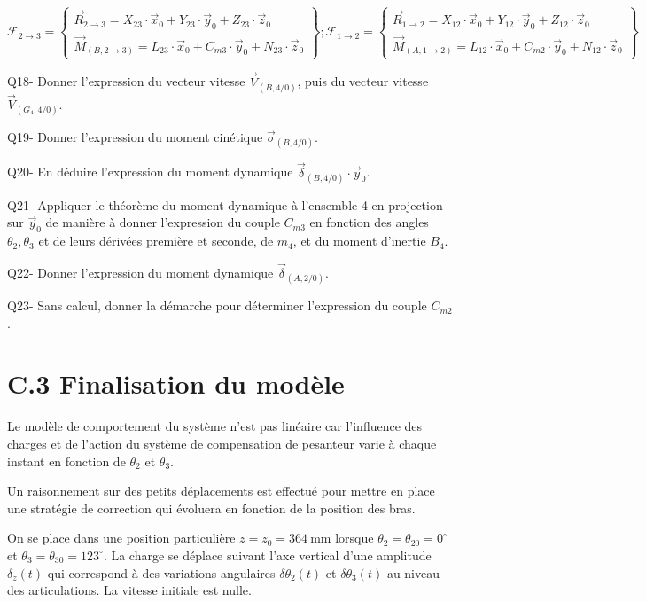 $\mathscr{F}_{2 \rightarrow 3}=\left\{\begin{array}{c}\vec{R}_{2 \rightarrow 3}=X_{23} \cdot \vec{x}_{0}+Y_{23} \cdot \vec{y}_{0}+Z_{23} \cdot \vec{z}_{0} \\ \vec{M}_{(B, 2 \rightarrow 3)}=L_{23} \cdot \vec{x}_{0}+C_{m 3} \cdot \vec{y}_{0}+N_{23} \cdot \vec{z}_{0}\end{array}\right\} ; \mathscr{F}_{1 \rightarrow 2}=\left\{\begin{array}{c}\vec{R}_{1 \rightarrow 2}=X_{12} \cdot \vec{x}_{0}+Y_{12} \cdot \vec{y}_{0}+Z_{12} \cdot \vec{z}_{0} \\ \vec{M}_{(A, 1 \rightarrow 2)}=L_{12} \cdot \vec{x}_{0}+C_{m 2} \cdot \vec{y}_{0}+N_{12} \cdot \vec{z}_{0}\end{array}\right\}$

Q18- Donner l'expression du vecteur vitesse $\vec{V}_{(B, 4 / 0)}$, puis du vecteur vitesse $\vec{V}_{\left(G_{4}, 4 / 0\right)}$.

Q19- Donner l'expression du moment cinétique $\vec{\sigma}_{(B, 4 / 0)}$.

Q20- En déduire l'expression du moment dynamique $\vec{\delta}_{(B, 4 / 0)} \cdot \vec{y}_{0}$.

Q21- Appliquer le théorème du moment dynamique à l'ensemble 4 en projection sur $\vec{y}_{0}$ de manière à donner l'expression du couple $C_{m 3}$ en fonction des angles $\theta_{2}, \theta_{3}$ et de leurs dérivées première et seconde, de $m_{4}$, et du moment d'inertie $B_{4}$.

Q22- Donner l'expression du moment dynamique $\vec{\delta}_{(A, 2 / 0)}$.

Q23- Sans calcul, donner la démarche pour déterminer l'expression du couple $C_{m 2}$.

\section*{C.3 Finalisation du modèle}
Le modèle de comportement du système n'est pas linéaire car l'influence des charges et de l'action du système de compensation de pesanteur varie à chaque instant en fonction de $\theta_{2}$ et $\theta_{3}$.

Un raisonnement sur des petits déplacements est effectué pour mettre en place une stratégie de correction qui évoluera en fonction de la position des bras.

On se place dans une position particulière $z=z_{0}=364 \mathrm{~mm}$ lorsque $\theta_{2}=\theta_{20}=0^{\circ}$ et $\theta_{3}=\theta_{30}=123^{\circ}$. La charge se déplace suivant l'axe vertical d'une amplitude $\delta_{z}(t)$ qui correspond à des variations angulaires $\delta \theta_{2}(t)$ et $\delta \theta_{3}(t)$ au niveau des articulations. La vitesse initiale est nulle.

